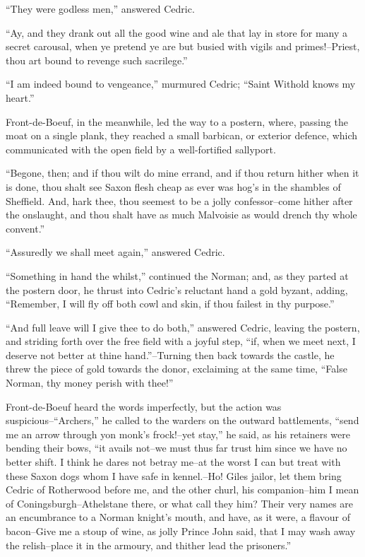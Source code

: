 ``They were godless men,'' answered Cedric.

``Ay, and they drank out all the good wine and ale that lay in store for
many a secret carousal, when ye pretend ye are but busied with vigils
and primes!--Priest, thou art bound to revenge such sacrilege.''

``I am indeed bound to vengeance,'' murmured Cedric; ``Saint Withold
knows my heart.''

Front-de-Boeuf, in the meanwhile, led the way to a postern, where,
passing the moat on a single plank, they reached a small barbican, or
exterior defence, which communicated with the open field by a
well-fortified sallyport.

``Begone, then; and if thou wilt do mine errand, and if thou return
hither when it is done, thou shalt see Saxon flesh cheap as ever was
hog's in the shambles of Sheffield. And, hark thee, thou seemest to be a
jolly confessor--come hither after the onslaught, and thou shalt have as
much Malvoisie as would drench thy whole convent.''

``Assuredly we shall meet again,'' answered Cedric.

``Something in hand the whilst,'' continued the Norman; and, as they
parted at the postern door, he thrust into Cedric's reluctant hand a
gold byzant, adding, ``Remember, I will fly off both cowl and skin, if
thou failest in thy purpose.''

``And full leave will I give thee to do both,'' answered Cedric, leaving
the postern, and striding forth over the free field with a joyful step,
``if, when we meet next, I deserve not better at thine hand.''--Turning
then back towards the castle, he threw the piece of gold towards the
donor, exclaiming at the same time, ``False Norman, thy money perish
with thee!''

Front-de-Boeuf heard the words imperfectly, but the action was
suspicious--``Archers,'' he called to the warders on the outward
battlements, ``send me an arrow through yon monk's frock!--yet stay,''
he said, as his retainers were bending their bows, ``it avails not--we
must thus far trust him since we have no better shift. I think he dares
not betray me--at the worst I can but treat with these Saxon dogs whom I
have safe in kennel.--Ho! Giles jailor, let them bring Cedric of
Rotherwood before me, and the other churl, his companion--him I mean of
Coningsburgh--Athelstane there, or what call they him? Their very names
are an encumbrance to a Norman knight's mouth, and have, as it were, a
flavour of bacon--Give me a stoup of wine, as jolly Prince John said,
that I may wash away the relish--place it in the armoury, and thither
lead the prisoners.''

